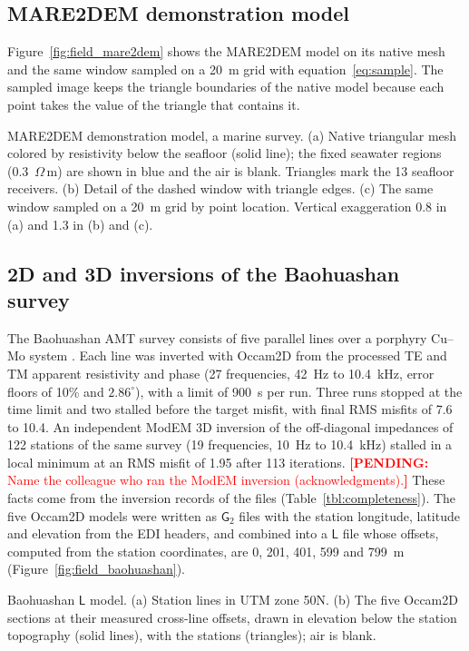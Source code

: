 \documentclass[manuscript]{geophysics}
\DeclareRobustCommand{\pending}[1]{\textcolor{red}{\textbf{[PENDING:} #1\textbf{]}}}
\newcommand{\ohmm}{\ensuremath{\Omega\,\mathrm{m}}}
\newcommand{\Gtwo}{\mathsf{G}_{2}}
\newcommand{\Lset}{\mathsf{L}}
\begin{document}
\subsection{MARE2DEM demonstration model}

Figure~\ref{fig:field_mare2dem} shows the MARE2DEM model on its native
mesh and the same window sampled on a 20~m grid with
equation~\ref{eq:sample}. The sampled image keeps the triangle
boundaries of the native model because each point takes the value of
the triangle that contains it.

{MARE2DEM demonstration model, a marine survey. (a) Native
triangular mesh colored by resistivity below the seafloor (solid
line); the fixed seawater regions (0.3~\ohmm) are shown in blue and the
air is blank. Triangles mark the 13 seafloor receivers. (b) Detail of
the dashed window with triangle edges. (c) The same window sampled on
a 20~m grid by point location. Vertical exaggeration 0.8 in (a) and
1.3 in (b) and (c).}

\subsection{2D and 3D inversions of the Baohuashan survey}

The Baohuashan AMT survey consists of five parallel lines over a
porphyry Cu--Mo system \citep{Kouabena2025}. Each line was inverted
with Occam2D from the processed TE and TM apparent resistivity and
phase (27 frequencies, 42~Hz to 10.4~kHz, error floors of 10\% and
$2.86^\circ$), with a limit of 900~s per run. Three runs stopped at the
time limit and two stalled before the target misfit, with final RMS
misfits of 7.6 to 10.4. An independent ModEM 3D inversion of the
off-diagonal impedances of 122 stations of the same survey (19
frequencies, 10~Hz to 10.4~kHz) stalled in a local minimum at an RMS
misfit of 1.95 after 113 iterations.
\pending{Name the colleague who ran the ModEM inversion
(acknowledgments).}
These facts come from the inversion records of the files
(Table~\ref{tbl:completeness}). The five Occam2D models were written as
$\Gtwo$ files with the station longitude, latitude and elevation
from the EDI headers, and combined into a $\Lset$ file whose
offsets, computed from the station coordinates, are 0, 201, 401, 599
and 799~m (Figure~\ref{fig:field_baohuashan}).

{Baohuashan $\Lset$ model. (a) Station lines in UTM zone 50N.
(b) The five Occam2D sections at their measured cross-line offsets,
drawn in elevation below the station topography (solid lines), with
the stations (triangles); air is blank.}
\end{document}

